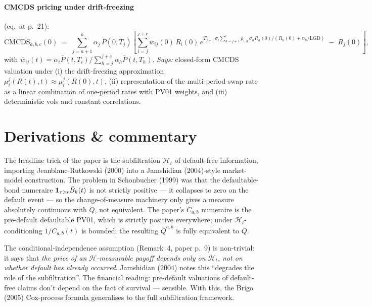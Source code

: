 \documentclass[11pt,a4paper]{article}
\begin{document}
\paragraph{CMCDS pricing under drift-freezing} (eq.~at p.~21):
\begin{equation}\label{eq:cdsmm-cmcds}
  \text{CMCDS}_{a,b,c}(0)
  \;=\; \sum_{j=a+1}^{b} \alpha_j\, \bar P(0, T_j)
        \left[ \sum_{i=j}^{j+c} \bar w_{ij}(0)\, R_i(0)\, e^{T_{j-1}\, \sigma_i \sum_{h=j+1}^{i} \rho_{i,h}\, \sigma_h R_h(0)/(R_h(0)+\alpha_h/\mathrm{LGD})}
                \;-\; R_j(0) \right],
\end{equation}
with $\bar w_{ij}(t) = \alpha_i \bar P(t, T_i)/\sum_{h=j}^{j+c} \alpha_h \bar P(t, T_h)$.
\textit{Says:} closed-form CMCDS valuation under (i) the
drift-freezing approximation $\mu^j_i(R(t), t) \approx \mu^j_i(R(0), t)$,
(ii) representation of the multi-period swap rate as a linear
combination of one-period rates with PV01 weights, and (iii)
deterministic vols and constant correlations.

\section{Derivations \& commentary}

\begin{commentary}
The headline trick of the paper is the subfiltration $\mathcal{H}_t$
of default-free information, importing Jeanblanc-Rutkowski (2000)
into a Jamshidian (2004)-style market-model construction. The
problem in Schonbucher (1999) was that the defaultable-bond
numeraire $\mathbf{1}_{\tau > t}\bar B_k(t)$ is not strictly positive --- it
collapses to zero on the default event --- so the change-of-measure
machinery only gives a measure absolutely continuous with $Q$, not
equivalent. The paper's $C_{a,b}$ numeraire is the pre-default
defaultable PV01, which is strictly positive everywhere; under
$\mathcal{H}_t$-conditioning $1/C_{a,b}(t)$ is bounded; the resulting
$\bar Q^{a,b}$ is fully equivalent to $Q$.
\end{commentary}

\begin{commentary}
The conditional-independence assumption (Remark~4, paper p.~9) is
non-trivial: it says that \emph{the price of an $\mathcal{H}$-measurable
payoff depends only on $\mathcal{H}_t$, not on whether default has
already occurred}. Jamshidian (2004) notes this ``degrades the role
of the subfiltration''. The financial reading: pre-default valuations
of default-free claims don't depend on the fact of survival ---
sensible. With this, the Brigo (2005) Cox-process formula
generalises to the full subfiltration framework.
\end{commentary}
\end{document}
